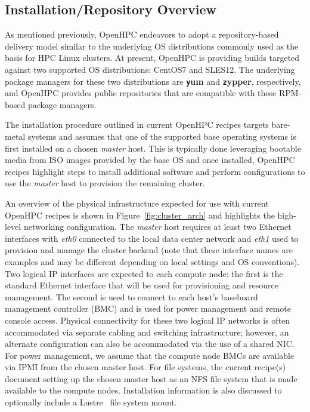 \documentclass{sig-alternate-05-2015}
\begin{document}
\subsection{Installation/Repository Overview}
\label{sec:repo_enable}

As mentioned previously, OpenHPC endeavors to adopt a repository-based delivery
model similar to the underlying OS distributions commonly used as the basis for HPC
Linux clusters.  At present, OpenHPC is providing builds targeted against two
supported OS distributions: CentOS7 and SLES12. The underlying package
managers for these two distributions are {\bf \texttt yum} and {\bf \texttt zypper},
respectively, and OpenHPC provides public repositories that are compatible with
these RPM-based package managers.

The installation procedure outlined in current OpenHPC recipes targets
bare-metal systems and assumes that one of the supported base operating systems
is first installed on a chosen {\em master} host. This is typically done
leveraging bootable media from ISO images provided by the base OS and once
installed, OpenHPC recipes highlight steps to install additional software and
perform configurations to use the {\em master} host to provision the remaining
cluster.

An overview of the physical infrastructure expected for use with
current OpenHPC recipes is shown in
Figure~\ref{fig:cluster_arch} and highlights the high-level networking
configuration. The {\em master} host requires at least two Ethernet interfaces
with {\em eth0} connected to the local data center network and {\em eth1} used
to provision and manage the cluster backend (note that these interface names
are examples and may be different depending on local settings and OS
conventions). Two logical IP interfaces are expected to each compute node: the
first is the standard Ethernet interface that will be used for provisioning and
resource management. The second is used to connect to each host's baseboard
management controller (BMC) and is
used for power management and remote console access. Physical connectivity for
these two logical IP networks is often accommodated via separate cabling and
switching infrastructure; however, an alternate configuration can also be
accommodated via the use of a shared NIC.
For power management, we assume that the compute node 
BMCs are available via IPMI from the chosen master host. For file
systems, the current recipe(s) document setting up the chosen master
host as an NFS file system that is made available to the compute
nodes. Installation information is also discussed to optionally include a
Lustre~\cite{Lustre_url} file system mount.
\end{document}
